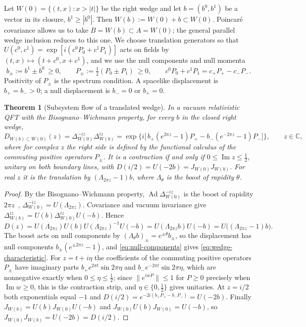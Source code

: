 \documentclass[a4paper,11pt]{article}
\newtheorem{theorem}{Theorem}
\theoremstyle{definition}
\begin{document}
Let $W(0)=\{(t,x):x>|t|\}$ be the right wedge and let $b=(b^0,b^1)$ be a vector in its closure, $b^1\ge|b^0|$. Then $W(b):=W(0)+b\subset W(0)$. Poincar\'e covariance allows us to take $B=W(b)\subset A=W(0)$; the general parallel wedge inclusion reduces to this one. We choose translation generators so that $U(c^0,c^1)=\exp[i(c^0P_0+c^1P_1)]$ acts on fields by $(t,x)\mapsto(t+c^0,x+c^1)$, and we use the null components and null momenta
\begin{equation}
 b_\pm:=b^1\pm b^0\ \ge0,\qquad
 P_\pm:=\tfrac12(P_0\pm P_1)\ \ge0,\qquad
 c^0P_0+c^1P_1=c_+P_+-c_-P_- .
 \label{eq:null-components}
\end{equation}
Positivity of $P_\pm$ is the spectrum condition. A spacelike displacement is $b_+=b_->0$; a null displacement is $b_-=0$ or $b_+=0$.

\begin{theorem}[Subsystem flow of a translated wedge]
\label{thm:wedge-characteristic}
In a vacuum relativistic QFT with the Bisognano--Wichmann property, for every $b$ in the closed right wedge,
\begin{equation}
 D_{W(b)\subset W(0)}(z)=\Delta_{W(0)}^{-iz}\Delta_{W(b)}^{iz}
 =\exp\Big\{i\big[\,b_+(e^{2\pi z}-1)P_+-b_-(e^{-2\pi z}-1)P_-\big]\Big\},
 \qquad z\in\mathbb C ,
 \label{eq:wedge-characteristic}
\end{equation}
where for complex $z$ the right side is defined by the functional calculus of the commuting positive operators $P_\pm$. It is a contraction if and only if $0\le\operatorname{Im}z\le\tfrac12$, unitary on both boundary lines, with $D(i/2)=U(-2b)=J_{W(0)}J_{W(b)}$. For real $z$ it is the translation by $(\Lambda_{2\pi z}-1)b$, where $\Lambda_\theta$ is the boost of rapidity $\theta$.
\end{theorem}
\begin{proof}
By the Bisognano--Wichmann property, $\operatorname{Ad}\Delta_{W(0)}^{-iz}$ is the boost of rapidity $2\pi z$~\cite{BisognanoWichmann1975}, $\Delta_{W(0)}^{-iz}=U(\Lambda_{2\pi z})$. Covariance and vacuum invariance give $\Delta_{W(b)}^{iz}=U(b)\Delta_{W(0)}^{iz}U(-b)$. Hence
\[
 D(z)=U(\Lambda_{2\pi z})U(b)U(\Lambda_{2\pi z})^{-1}U(-b)=U(\Lambda_{2\pi z}b)U(-b)=U\bigl((\Lambda_{2\pi z}-1)b\bigr).
\]
The boost acts on null components by $(\Lambda_\theta b)_\pm=e^{\pm\theta}b_\pm$, so the displacement has null components $b_\pm(e^{\pm2\pi z}-1)$, and \eqref{eq:null-components} gives \eqref{eq:wedge-characteristic}. For $z=t+i\eta$ the coefficients of the commuting positive operators $P_\pm$ have imaginary parts $b_+e^{2\pi t}\sin2\pi\eta$ and $b_-e^{-2\pi t}\sin2\pi\eta$, which are nonnegative exactly when $0\le\eta\le\tfrac12$; since $\|e^{iwP}\|\le1$ for $P\ge0$ precisely when $\operatorname{Im}w\ge0$, this is the contraction strip, and $\eta\in\{0,\tfrac12\}$ gives unitaries. At $z=i/2$ both exponentials equal $-1$ and $D(i/2)=e^{-2i(b_+P_+-b_-P_-)}=U(-2b)$. Finally $J_{W(b)}=U(b)J_{W(0)}U(-b)$ and $J_{W(0)}U(b)J_{W(0)}=U(-b)$, so $J_{W(0)}J_{W(b)}=U(-2b) = D(i/2)$.
\end{proof}
\end{document}
